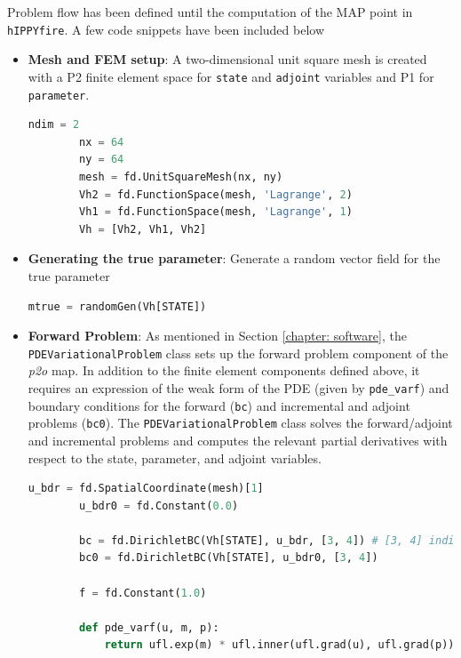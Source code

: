 Problem flow has been defined until the computation of the MAP point in \texttt{hIPPYfire}. A few code snippets have been included below

\begin{itemize}
    \item \textbf{Mesh and FEM setup}: A two-dimensional unit square mesh is created with a P2 finite element space for \texttt{state} and \texttt{adjoint} variables and P1 for \texttt{parameter}.
    \begin{lstlisting}[language=python]
        ndim = 2
        nx = 64
        ny = 64
        mesh = fd.UnitSquareMesh(nx, ny)
        Vh2 = fd.FunctionSpace(mesh, 'Lagrange', 2)
        Vh1 = fd.FunctionSpace(mesh, 'Lagrange', 1)
        Vh = [Vh2, Vh1, Vh2]
    \end{lstlisting}
    \item \textbf{Generating the true parameter}: Generate a random vector field for the true parameter
    \begin{lstlisting}[language=python]
        mtrue = randomGen(Vh[STATE])
    \end{lstlisting}
    \item \textbf{Forward Problem}: As mentioned in Section \ref{chapter: software}, the \texttt{PDEVariationalProblem} class sets up the forward problem component of the \textit{p2o} map. In addition to the finite element components defined above, it requires an expression of the weak form of the PDE (given by \texttt{pde\_varf}) and boundary conditions for the forward (\texttt{bc}) and incremental and adjoint problems (\texttt{bc0}).
    The \texttt{PDEVariationalProblem} class solves the forward/adjoint and incremental problems and computes the relevant partial derivatives with respect to the state, parameter, and adjoint variables.
    \begin{lstlisting}[language=python]
        u_bdr = fd.SpatialCoordinate(mesh)[1]
        u_bdr0 = fd.Constant(0.0)

        bc = fd.DirichletBC(Vh[STATE], u_bdr, [3, 4]) # [3, 4] indicates that bc is applied to y == 0 amd y ==1
        bc0 = fd.DirichletBC(Vh[STATE], u_bdr0, [3, 4])

        f = fd.Constant(1.0)

        def pde_varf(u, m, p):
            return ufl.exp(m) * ufl.inner(ufl.grad(u), ufl.grad(p)) * ufl.dx - f * p * ufl.dx


\end{lstlisting}
\end{itemize}
